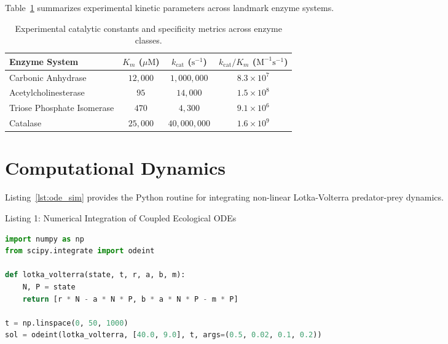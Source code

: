 \documentclass[12pt, a4paper]{article}
\begin{document}
Table~\ref{tab:kinetics} summarizes experimental kinetic parameters across landmark enzyme systems.

\begin{table}[H]
    \centering
    \small
    \caption{Experimental catalytic constants and specificity metrics across enzyme classes.}
    \label{tab:kinetics}
    \begin{tabular}{@{} l c c c @{}}
        \toprule
        \rowcolor{tableheader}
        \textbf{Enzyme System} & \textbf{$K_m$ ($\mu\mathrm{M}$)} & \textbf{$k_{\mathrm{cat}}$ ($\mathrm{s}^{-1}$)} & \textbf{$k_{\mathrm{cat}}/K_m$ ($\mathrm{M}^{-1}\mathrm{s}^{-1}$)} \\
        \midrule
        Carbonic Anhydrase         & $12{,}000$ & $1{,}000{,}000$ & $8.3 \times 10^7$ \\
        Acetylcholinesterase       & $95$       & $14{,}000$      & $1.5 \times 10^8$ \\
        Triose Phosphate Isomerase & $470$      & $4{,}300$       & $9.1 \times 10^6$ \\
        Catalase                   & $25{,}000$ & $40{,}000{,}000$& $1.6 \times 10^9$ \\
        \bottomrule
    \end{tabular}
\end{table}

\section{Computational Dynamics}
Listing~\ref{lst:ode_sim} provides the Python routine for integrating non-linear Lotka-Volterra predator-prey dynamics.

\begin{biobox}[label={lst:ode_sim}]{Listing 1: Numerical Integration of Coupled Ecological ODEs}
\begin{lstlisting}[language=Python]
import numpy as np
from scipy.integrate import odeint

def lotka_volterra(state, t, r, a, b, m):
    N, P = state
    return [r * N - a * N * P, b * a * N * P - m * P]

t = np.linspace(0, 50, 1000)
sol = odeint(lotka_volterra, [40.0, 9.0], t, args=(0.5, 0.02, 0.1, 0.2))
\end{lstlisting}
\end{biobox}



\end{document}
